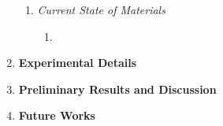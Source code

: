 \documentclass{article}
\begin{document}
\begin{enumerate}
\begin{enumerate}
		\item{\emph{Current State of \Td Materials}}
		\begin{enumerate}%
			\item{}
		\end{enumerate}%
	\end{enumerate}%

	\item{\textbf{Experimental Details}}

	\item{\textbf{Preliminary Results and Discussion}}

	\item{\textbf{Future Works}}

\end{enumerate} %



\end{document}
